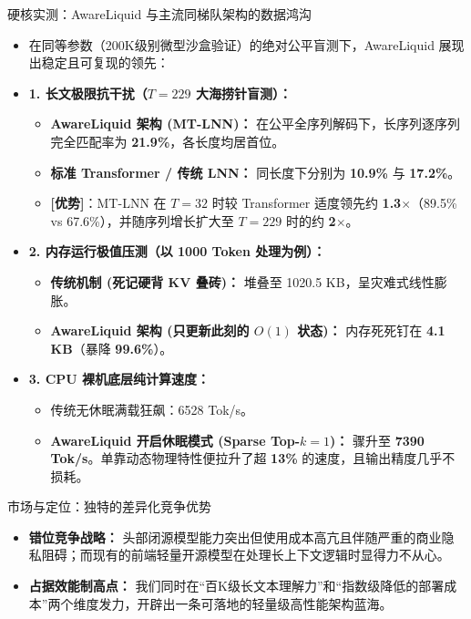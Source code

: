 ﻿\documentclass[aspectratio=169, 10pt]{beamer}
\begin{document}
\begin{frame}[allowframebreaks]{硬核实测：AwareLiquid 与主流同梯队架构的数据鸿沟}
\small
\begin{itemize}\itemsep=0.3em
    \item 在同等参数（200K级别微型沙盒验证）的绝对公平盲测下，AwareLiquid 展现出稳定且可复现的领先：
    \vspace{0.5em}
    \item \textbf{1. 长文极限抗干扰（$T=229$ 大海捞针盲测）：}
    \begin{itemize}
        \item \textbf{AwareLiquid 架构 (MT-LNN)：} 在公平全序列解码下，长序列逐序列完全匹配率为 \textbf{21.9\%}，各长度均居首位。
        \item \textbf{标准 Transformer / 传统 LNN：} 同长度下分别为 \textbf{10.9\%} 与 \textbf{17.2\%}。
        \item \textbf{[优势]}：MT-LNN 在 $T=32$ 时较 Transformer 适度领先约 \textbf{1.3$\times$}（89.5\% vs 67.6\%），并随序列增长扩大至 $T=229$ 时的约 \textbf{2$\times$}。
    \end{itemize}
    \vspace{0.3em}
    \item \textbf{2. 内存运行极值压测（以 1000 Token 处理为例）：}
    \begin{itemize}
        \item \textbf{传统机制 (死记硬背 KV 叠砖)：} 堆叠至 1020.5 KB，呈灾难式线性膨胀。
        \item \textbf{AwareLiquid 架构 (只更新此刻的 $O(1)$ 状态)：} 内存死死钉在 \textbf{4.1 KB}（暴降 \textbf{99.6\%}）。
    \end{itemize}
    \vspace{0.3em}
    \item \textbf{3. CPU 裸机底层纯计算速度：}
    \begin{itemize}
        \item 传统无休眠满载狂飙：6528 Tok/s。
        \item \textbf{AwareLiquid 开启休眠模式 (Sparse Top-$k=1$)：} 骤升至 \textbf{7390 Tok/s}。单靠动态物理特性便拉升了超 \textbf{13\%} 的速度，且输出精度几乎不损耗。
    \end{itemize}
\end{itemize}
\end{frame}

\begin{frame}{市场与定位：独特的差异化竞争优势}
\begin{itemize}
    \item \textbf{错位竞争战略：} 头部闭源模型能力突出但使用成本高亢且伴随严重的商业隐私阻碍；而现有的前端轻量开源模型在处理长上下文逻辑时显得力不从心。
    \item \textbf{占据效能制高点：} 我们同时在“百K级长文本理解力”和“指数级降低的部署成本”两个维度发力，开辟出一条可落地的轻量级高性能架构蓝海。
\end{itemize}
\end{frame}
\end{document}
